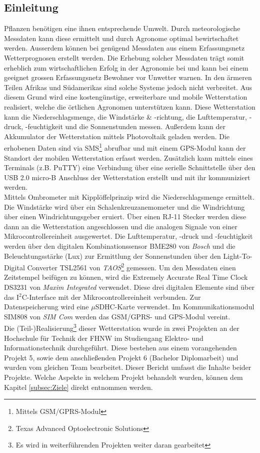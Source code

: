 \subsection{Einleitung}
\label{subsec:einleitung}
Pflanzen benötigen eine ihnen entsprechende Umwelt. Durch meteorologische Messdaten kann diese ermittelt und durch Agronome optimal bewirtschaftet werden. Ausserdem können bei genügend Messdaten aus einem Erfassungsnetz Wetterprognosen erstellt werden. Die Erhebung solcher Messdaten trägt somit erheblich zum wirtschaftlichen Erfolg in der Agronomie bei und kann bei einem geeignet grossen Erfassungsnetz Bewohner vor Unwetter warnen. In den ärmeren Teilen Afrikas und Südamerikas sind solche Systeme jedoch nicht verbreitet. Aus diesem Grund wird eine kostengünstige, erweiterbare und mobile Wetterstation realisiert, welche die örtlichen Agronomen unterstützen kann. Diese Wetterstation kann die Niederschlagsmenge, die Windstärke \& -richtung, die Lufttemperatur, -druck, -feuchtigkeit und die Sonnenstunden messen. Außerdem kann der Akkumulator der Wetterstation mittels Photovoltaik geladen werden. Die erhobenen Daten sind via SMS\footnote{Mittels GSM/GPRS-Modul} abrufbar und mit einem GPS-Modul kann der Standort der mobilen Wetterstation erfasst werden. Zusätzlich kann mittels eines Terminals (z.B. PuTTY) eine Verbindung über eine serielle Schnittstelle über den USB 2.0 micro-B Anschluss der Wetterstation erstellt und mit ihr kommuniziert werden.\\

Mittels Ombrometer mit Kipplöffelprinzip wird die Niederschlagsmenge ermittelt. Die Windstärke wird über ein Schalenkreuzanemometer und die Windrichtung über einen Windrichtungsgeber eruiert. Über einen RJ-11 Stecker werden diese dann an die Wetterstation angeschlossen und die analogen Signale von einer Mikrocontrollereinheit ausgewertet. Die Lufttemperatur, -druck und -feuchtigkeit werden über den digitalen Kombinationssensor BME280 von \textit{Bosch} und die Beleuchtungsstärke (Lux) zur Ermittlung der Sonnenstunden über den Light-To-Digital Converter TSL2561 von \textit{TAOS}\footnote{Texas Advanced Optoelectronic Solutions} gemessen. Um den Messdaten einen Zeitstempel beifügen zu können, wird die Extremely Accurate Real Time Clock DS3231 von \textit{Maxim Integrated} verwendet. Diese drei digitalen Elemente sind über das I$^{2}$C-Interface mit der Mikrocontrollereinheit verbunden. Zur Datenspeicherung wird eine $\mu$SDHC-Karte verwendet. Im Kommunikationsmodul SIM808 von \textit{SIM Com} werden das GSM/GPRS- und GPS-Modul vereint.\\

Die (Teil-)Realisierung\footnote{Es wird in weiterführenden Projekten weiter daran gearbeitet} dieser Wetterstation wurde in zwei Projekten an der Hochschule für Technik der FHNW im Studiengang Elektro- und Informationstechnik durchgeführt. Diese bestehen aus einem vorangehenden Projekt 5, sowie dem anschließenden Projekt 6 (Bachelor Diplomarbeit) und wurden vom gleichen Team bearbeitet. Dieser Bericht umfasst die Inhalte beider Projekte. Welche Aspekte in welchem Projekt behandelt wurden, können dem Kapitel \ref{subsec:Ziele}  direkt entnommen werden.\\

